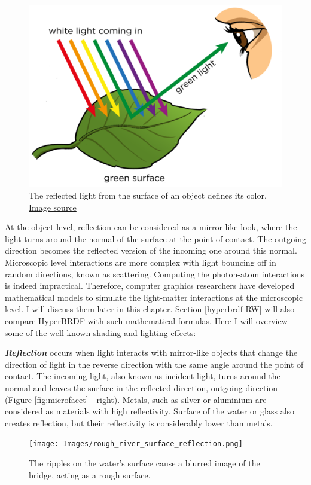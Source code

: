 \begin{figure}
  \centering
   \includegraphics[width=0.5\linewidth]{Images/object-color.png}
   \caption{The reflected light from the surface of an object defines its color. \href{http://www.mstworkbooks.co.za/natural-sciences/gr8/images/gr8ec04-gd-0027.png}{Image source}}
   \label{fig:object-color}
\end{figure}



At the object level, reflection can be considered as a mirror-like look, where the light turns around the normal of the surface at the point of contact. The outgoing direction becomes the reflected version of the incoming one around this normal. Microscopic level interactions are more complex with light bouncing off in random directions, known as scattering. Computing the photon-atom interactions is indeed impractical. Therefore, computer graphics researchers have developed mathematical models to simulate the light-matter interactions at the microscopic level. I will discuss them later in this chapter. Section \ref{hyperbrdf-RW} will also compare HyperBRDF with such mathematical formulas. Here I will overview some of the well-known shading and lighting effects:

\textbf{\textit{Reflection}} occurs when light interacts with mirror-like objects that change the direction of light in the reverse direction with the same angle around the point of contact. The incoming light, also known as incident light, turns around the normal and leaves the surface in the reflected direction, outgoing direction (Figure \ref{fig:microfacet} - right). Metals, such as silver or aluminium are considered as materials with high reflectivity. Surface of the water or glass also creates reflection, but their reflectivity is considerably lower than metals.

\begin{figure}
\texttt{[image: Images/rough\_river\_surface\_reflection.png]}
\caption{The ripples on the water's surface cause a blurred image of the bridge, acting as a rough surface.}\label{fig:water_reflection}
    
\end{figure} 

